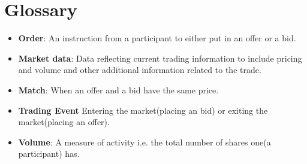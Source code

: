 \documentclass[12pt]{article}
\begin{document}
	\newpage				
	\section{Glossary}	
		\begin{itemize}
			\item \textbf{Order}: An instruction from a participant to either put in an offer or a bid.
			\item \textbf{Market data}: Data reflecting current trading information to include pricing and volume and other additional information related to the trade.
			\item \textbf{Match}: When an offer and a bid have the same price.
			\item \textbf{Trading Event} Entering the market(placing an bid) or exiting the market(placing an offer). 
			\item \textbf{Volume}: A measure of activity i.e. the total number of shares one(a participant) has. 
		\end{itemize}				    			    			    		
\end{document}
